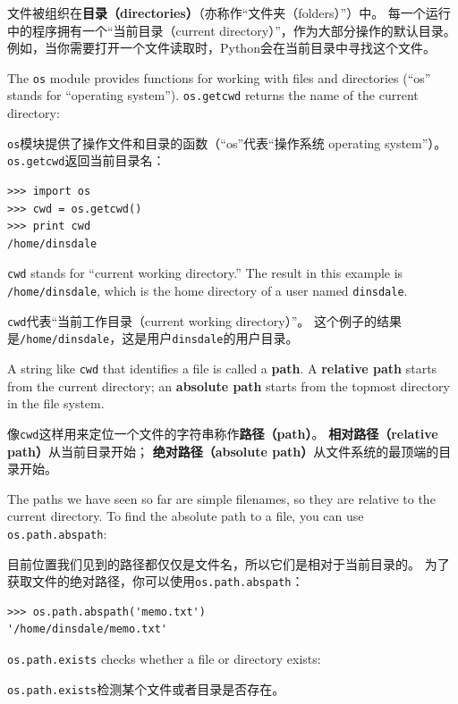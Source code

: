 \documentclass[10pt]{book}
\begin{document}
\begin{CJK}{UTF8}{gbsn}
文件被组织在{\bf 目录（directories）}（亦称作``文件夹（folders）''）中。
每一个运行中的程序拥有一个``当前目录（current directory）''，作为大部分操作的默认目录。
例如，当你需要打开一个文件读取时，Python会在当前目录中寻找这个文件。

The {\tt os} module provides functions for working with files and
directories (``os'' stands for ``operating system'').  {\tt os.getcwd}
returns the name of the current directory:

{\tt os}模块提供了操作文件和目录的函数（``os''代表``操作系统 operating system''）。
{\tt os.getcwd}返回当前目录名：

\begin{verbatim}
>>> import os
>>> cwd = os.getcwd()
>>> print cwd
/home/dinsdale
\end{verbatim}
%
{\tt cwd} stands for ``current working directory.''  The result in
this example is {\tt /home/dinsdale}, which is the home directory of a
user named {\tt dinsdale}.

{\tt cwd}代表``当前工作目录（current working directory）''。
这个例子的结果是{\tt /home/dinsdale}，这是用户{\tt dinsdale}的用户目录。

A string like {\tt cwd} that identifies a file is called a {\bf path}.
A {\bf relative path} starts from the current directory;
an {\bf absolute path} starts from the topmost directory in the
file system.

像{\tt cwd}这样用来定位一个文件的字符串称作{\bf 路径（path）}。
{\bf 相对路径（relative path）}从当前目录开始；
{\bf 绝对路径（absolute path）}从文件系统的最顶端的目录开始。

The paths we have seen so far are simple filenames, so they are
relative to the current directory.  To find the absolute path to
a file, you can use {\tt os.path.abspath}:

目前位置我们见到的路径都仅仅是文件名，所以它们是相对于当前目录的。
为了获取文件的绝对路径，你可以使用{\tt os.path.abspath}：

\begin{verbatim}
>>> os.path.abspath('memo.txt')
'/home/dinsdale/memo.txt'
\end{verbatim}
%
{\tt os.path.exists} checks
whether a file or directory exists:

{\tt os.path.exists}检测某个文件或者目录是否存在。


\end{CJK}
\end{document}
